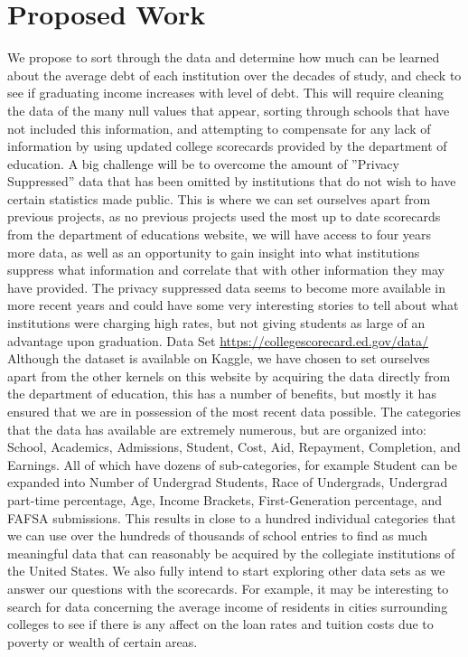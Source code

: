 \documentclass[11pt]{article}
\begin{document}
\section*{Proposed Work}
\label{sec-2}
We propose to sort through the data and determine how much can be learned about the average debt of each institution over the decades of study, and check to see if graduating income increases with level of debt. This will require cleaning the data of the many null values that appear, sorting through schools that have not included this information, and attempting to compensate for any lack of information by using updated college scorecards provided by the department of education. A big challenge will be to overcome the amount of ”Privacy Suppressed” data that has been omitted by institutions that do not wish to have certain statistics made public. This is where we can set ourselves apart from previous projects, as no previous projects used the most up to date scorecards from the department of educations website, we will have access to four years more data, as well as an opportunity to gain insight into what institutions suppress what information and correlate that with other information they may have provided. The privacy suppressed data seems to become more available in more recent years and could have some very interesting stories to tell about what institutions were charging high rates, but not giving students as large of an advantage upon graduation. Data Set \url{https://collegescorecard.ed.gov/data/} Although the dataset is available on Kaggle, we have chosen to set ourselves apart from the other kernels on this website by acquiring the data directly from the department of education, this has a number of benefits, but mostly it has ensured that we are in possession of the most recent data possible. The categories that the data has available are extremely numerous, but are organized into: School, Academics, Admissions, Student, Cost, Aid, Repayment, Completion, and Earnings. All of which have dozens of sub-categories, for example Student can be expanded into Number of Undergrad Students, Race of Undergrads, Undergrad part-time percentage, Age, Income Brackets, First-Generation percentage, and FAFSA submissions. This results in close to a hundred individual categories that we can use over the hundreds of thousands of school entries to find as much meaningful data that can reasonably be acquired by the collegiate institutions of the United States. We also fully intend to start exploring other data sets as we answer our questions with the scorecards. For example, it may be interesting to search for data concerning the average income of residents in cities surrounding colleges to see if there is any affect on the loan rates and tuition costs due to poverty or wealth of certain areas.
\end{document}
